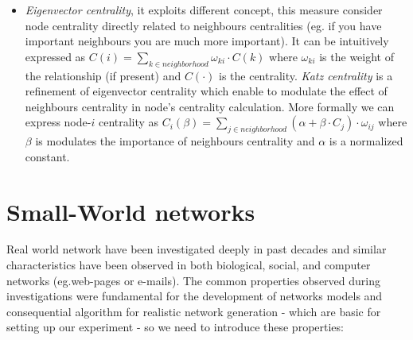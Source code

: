 \begin{description}
\begin{itemize}
\item \emph{Eigenvector centrality}, it exploits different concept, this measure consider node centrality directly related to neighbours centralities\cite{newman:2010} (eg. if you have important neighbours you are much more important). It can be intuitively expressed as $C(i)=\sum_{k \in neighborhood}{\omega_{ki} \cdot C(k)}$ where $\omega_{ki}$ is the weight of the relationship (if present) and $C(\cdot)$ is the centrality.
\emph{Katz centrality} is a refinement of eigenvector centrality which enable to modulate the effect of neighbours centrality in node's centrality calculation. More formally we can express node-$i$ centrality as $C_{i}(\beta)= \sum_{j \in neighborhood}{(\alpha + \beta \cdot C_{j})\cdot \omega_{ij}}$ where $\beta$ is modulates the importance of neighbours centrality and $\alpha$ is a normalized constant.
\end{itemize}
\end{description}

\section{Small-World networks}
\label{sn_smallworld}
Real world network have been investigated deeply in past decades and similar characteristics have been observed in both biological, social, and computer networks (eg.web-pages or e-mails\cite{ebel02:_scale}). 
The common properties observed during investigations were fundamental for the development of networks models and consequential algorithm for realistic network generation - which are basic for setting up our experiment - so we need to introduce these properties:


